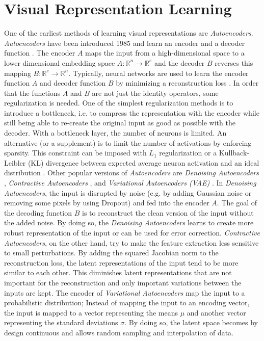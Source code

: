 \section{Visual Representation Learning}
One of the earliest methods of learning visual representations are \emph{Autoencoders}.
\emph{Autoencoders} have been introduced 1985  and learn an encoder and a decoder function .
The encoder $A$ maps the input from a high-dimensional space to a lower dimensional embedding space $A: \mathbb{R}^{n} \rightarrow \mathbb{R}^{e}$ and the decoder $B$ reverses this mapping $B: \mathbb{R}^{e} \rightarrow \mathbb{R}^{n}$.
Typically, neural networks are used to learn the encoder function $A$ and decoder function $B$ by minimizing a reconstruction loss .
In order that the functions $A$ and $B$ are not just the identity operators, some regularization is needed.
One of the simplest regularization methods is to introduce a bottleneck, i.e. to compress the representation with the encoder while still being able to re-create the original input as good as possible with the decoder.
With a bottleneck layer, the number of neurons is limited.
An alternative (or a supplement) is to limit the number of activations by enforcing sparsity.
This constraint can be imposed with $L_1$ regularization or a Kullback-Leibler (KL) divergence between expected average neuron activation and an ideal distribution .
Other popular versions of \emph{Autoencoders} are \emph{Denoising Autoencoders} , \emph{Contractive Autoencoders} , and \emph{Variational Autoencoders (VAE)} .
In \emph{Denoising Autoencoders}, the input is disrupted by noise (e.g. by adding Gaussian noise or removing some pixels by using Dropout) and fed into the encoder $A$.
The goal of the decoding function $B$ is to reconstruct the clean version of the input without the added noise.
By doing so, the \emph{Denoising Autoencoders} learns to create more robust representation of the input or can be used for error correction.
\emph{Contractive Autoencoders}, on the other hand, try to make the feature extraction less sensitive to small perturbations.
By adding the squared Jacobian norm to the reconstruction loss, the latent representations of the input tend to be more similar to each other.
This diminishes latent representations that are not important for the reconstruction and only important variations between the inputs are kept.
The encoder of \emph{Variational Autoencoders} map the input to a probabilistic distribution; Instead of mapping the input to an encoding vector, the input is mapped to a vector representing the means $\mu$ and another vector representing the standard deviations $\sigma$.
By doing so, the latent space becomes by design continuous and allows random sampling and interpolation of data.

